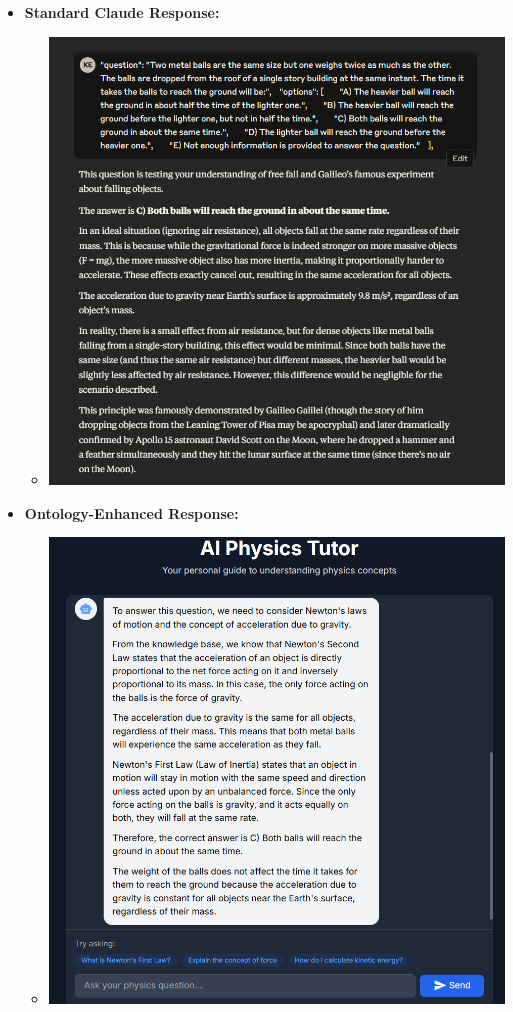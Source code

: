 \begin{itemize}
    \item \textbf{Standard Claude Response:}
    \begin{itemize}
        \item \includegraphics[width=\textwidth]{figures/screenshots/claude_base_line_model.png}
    \end{itemize}
    
    \item \textbf{Ontology-Enhanced Response:}
    \begin{itemize}
        \item \includegraphics[width=\textwidth]{figures/screenshots/ontology_enhance_model.png}
    \end{itemize}
\end{itemize}

